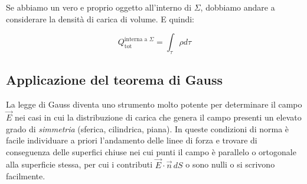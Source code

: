 \FloatBarrier

Se abbiamo un vero e proprio oggetto all'interno di $\Sigma$, dobbiamo andare a considerare la densità di carica di volume. E quindi:

\[
	Q_{\text{tot}}^{\text{interna a } \Sigma} = \int_{\tau}\rho d\tau
\]

\subsection{Applicazione del teorema di Gauss}

La legge di Gauss diventa uno strumento molto potente per determinare
il campo $\vec{E}$ nei casi in cui la distribuzione di carica che genera il campo presenti un elevato grado di \emph{simmetria} (sferica, cilindrica, piana). In queste condizioni di norma è facile individuare a priori l'andamento delle linee di forza e trovare di conseguenza delle superfici chiuse nei cui punti il campo è parallelo o ortogonale alla superficie stessa, per cui i contributi $\vec{E} \cdot \vec{n} \,dS$ o sono nulli o si scrivono facilmente.

